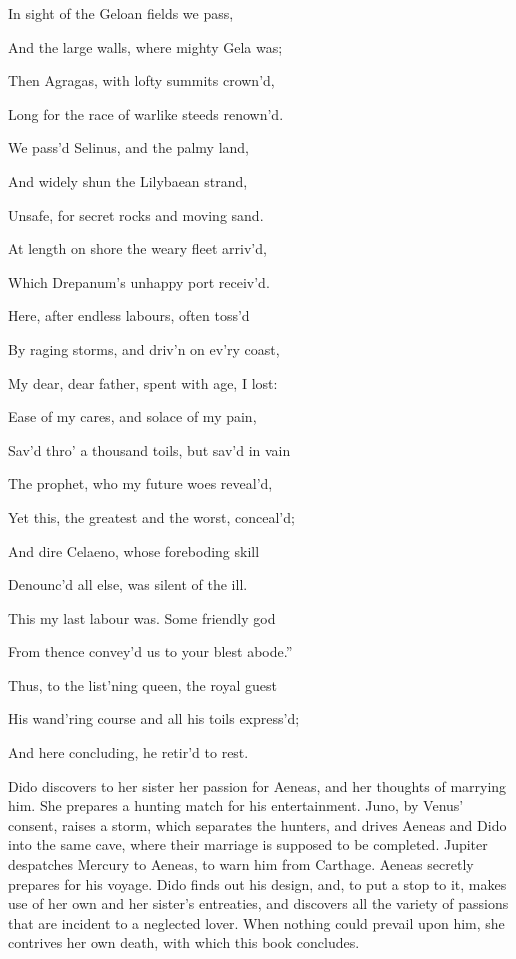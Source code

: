 In sight of the Geloan fields we pass,

And the large walls, where mighty Gela was;

Then Agragas, with lofty summits crown’d,

Long for the race of warlike steeds renown’d.

We pass’d Selinus, and the palmy land,

And widely shun the Lilybaean strand,

Unsafe, for secret rocks and moving sand.

At length on shore the weary fleet arriv’d,

Which Drepanum’s unhappy port receiv’d.

Here, after endless labours, often toss’d

By raging storms, and driv’n on ev’ry coast,

My dear, dear father, spent with age, I lost:

Ease of my cares, and solace of my pain,

Sav’d thro’ a thousand toils, but sav’d in vain

The prophet, who my future woes reveal’d,

Yet this, the greatest and the worst, conceal’d;

And dire Celaeno, whose foreboding skill

Denounc’d all else, was silent of the ill.

This my last labour was. Some friendly god

From thence convey’d us to your blest abode.”

Thus, to the list’ning queen, the royal guest

His wand’ring course and all his toils express’d;

And here concluding, he retir’d to rest.


Dido discovers to her sister her passion for Aeneas, and her thoughts of
marrying him. She prepares a hunting match for his entertainment. Juno, by
Venus’ consent, raises a storm, which separates the hunters, and drives
Aeneas and Dido into the same cave, where their marriage is supposed to be
completed. Jupiter despatches Mercury to Aeneas, to warn him from Carthage.
Aeneas secretly prepares for his voyage. Dido finds out his design, and, to
put a stop to it, makes use of her own and her sister’s entreaties, and
discovers all the variety of passions that are incident to a neglected lover.
When nothing could prevail upon him, she contrives her own death, with which
this book concludes.

